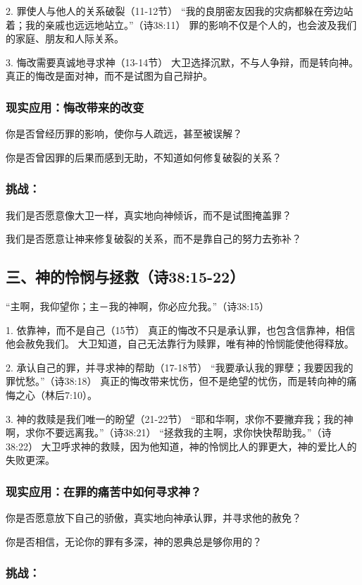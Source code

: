 \documentclass[a4paper, 12pt]{article}
\begin{document}
2. 罪使人与他人的关系破裂（11-12节）
“我的良朋密友因我的灾病都躲在旁边站着；我的亲戚也远远地站立。”（诗38:11）
罪的影响不仅是个人的，也会波及我们的家庭、朋友和人际关系。

3. 悔改需要真诚地寻求神（13-14节）
大卫选择沉默，不与人争辩，而是转向神。
真正的悔改是面对神，而不是试图为自己辩护。
\subsubsection*{现实应用：悔改带来的改变}
\hspace{0.6cm}你是否曾经历罪的影响，使你与人疏远，甚至被误解？

你是否曾因罪的后果而感到无助，不知道如何修复破裂的关系？
\subsubsection*{挑战：}

\hspace{0.6cm}我们是否愿意像大卫一样，真实地向神倾诉，而不是试图掩盖罪？

我们是否愿意让神来修复破裂的关系，而不是靠自己的努力去弥补？
\subsection*{三、神的怜悯与拯救（诗38:15-22）}
“主啊，我仰望你；主－我的神啊，你必应允我。”（诗38:15）

1. 依靠神，而不是自己（15节）
真正的悔改不只是承认罪，也包含信靠神，相信他会赦免我们。
大卫知道，自己无法靠行为赎罪，唯有神的怜悯能使他得释放。

2. 承认自己的罪，并寻求神的帮助（17-18节）
“我要承认我的罪孽；我要因我的罪忧愁。”（诗38:18）
真正的悔改带来忧伤，但不是绝望的忧伤，而是转向神的痛悔之心（林后7:10）。

3. 神的救赎是我们唯一的盼望（21-22节）
“耶和华啊，求你不要撇弃我；我的神啊，求你不要远离我。”（诗38:21）
“拯救我的主啊，求你快快帮助我。”（诗38:22）
大卫呼求神的救赎，因为他知道，神的怜悯比人的罪更大，神的爱比人的失败更深。
\subsubsection*{现实应用：在罪的痛苦中如何寻求神？}
\hspace{0.6cm}你是否愿意放下自己的骄傲，真实地向神承认罪，并寻求他的赦免？

你是否相信，无论你的罪有多深，神的恩典总是够你用的？
\subsubsection*{挑战：}
\end{document}
